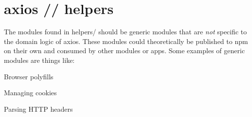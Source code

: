 \chapter{axios // helpers}
\hypertarget{md_pkiclassroomrescheduler_2src_2main_2frontend_2node__modules_2axios_2lib_2helpers_2_r_e_a_d_m_e}{}\label{md_pkiclassroomrescheduler_2src_2main_2frontend_2node__modules_2axios_2lib_2helpers_2_r_e_a_d_m_e}
\label{md_pkiclassroomrescheduler_2src_2main_2frontend_2node__modules_2axios_2lib_2helpers_2_r_e_a_d_m_e_autotoc_md5607}%
%
 The modules found in {\ttfamily helpers/} should be generic modules that are {\itshape not} specific to the domain logic of axios. These modules could theoretically be published to npm on their own and consumed by other modules or apps. Some examples of generic modules are things like\+:


\begin{DoxyItemize}
\item Browser polyfills
\item Managing cookies
\item Parsing HTTP headers 
\end{DoxyItemize}